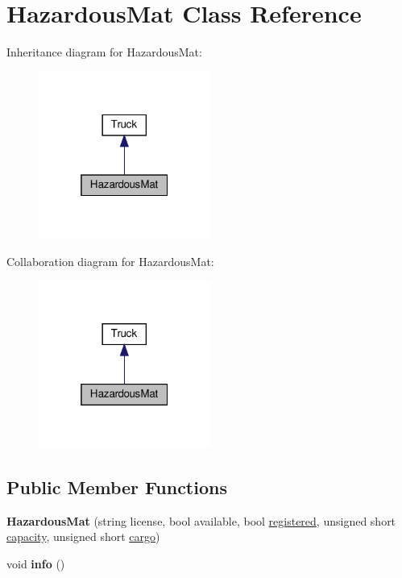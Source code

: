 \hypertarget{class_hazardous_mat}{}\section{Hazardous\+Mat Class Reference}
\label{class_hazardous_mat}


Inheritance diagram for Hazardous\+Mat\+:\nopagebreak
\begin{figure}[H]
\begin{center}
\leavevmode
\includegraphics[width=160pt]{class_hazardous_mat__inherit__graph}
\end{center}
\end{figure}


Collaboration diagram for Hazardous\+Mat\+:\nopagebreak
\begin{figure}[H]
\begin{center}
\leavevmode
\includegraphics[width=160pt]{class_hazardous_mat__coll__graph}
\end{center}
\end{figure}
\subsection*{Public Member Functions}
\begin{DoxyCompactItemize}
\item 
\mbox{\label{class_hazardous_mat_adff1b06ba4631c6b3f77168e4b792b1f}} 
{\bfseries Hazardous\+Mat} (string license, bool available, bool \hyperlink{class_truck_a80b8405cf7a15b236fef70116f99c4fb}{registered}, unsigned short \hyperlink{class_truck_a14541fad6d47c606ce4e1bd150a68a23}{capacity}, unsigned short \hyperlink{class_truck_a968fc6b1a6171a03e4254d6615da4ecd}{cargo})
\item 
\mbox{\label{class_hazardous_mat_ab07463da3e9a5d3b8933d2b01332ed00}} 
void {\bfseries info} ()
\end{DoxyCompactItemize}
